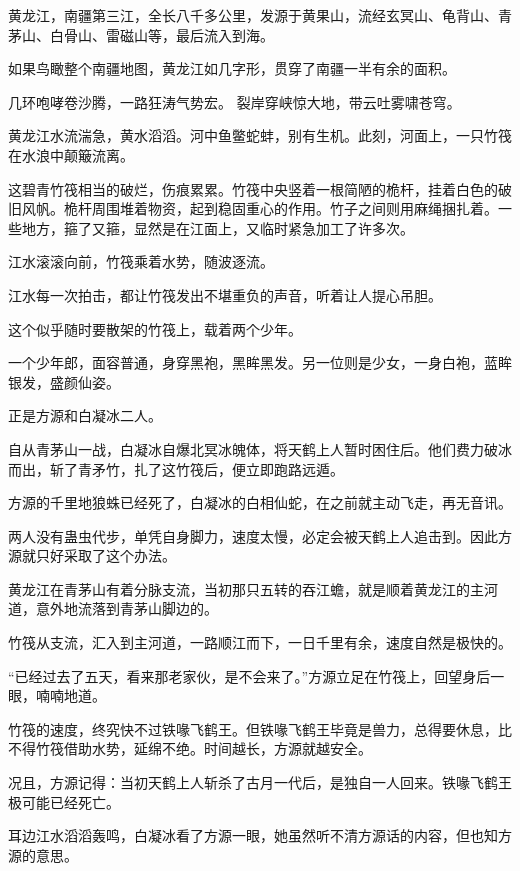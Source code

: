 
\begin{this_body}



黄龙江，南疆第三江，全长八千多公里，发源于黄果山，流经玄冥山、龟背山、青茅山、白骨山、雷磁山等，最后流入到海。

如果鸟瞰整个南疆地图，黄龙江如几字形，贯穿了南疆一半有余的面积。

几环咆哮卷沙腾，一路狂涛气势宏。 裂岸穿峡惊大地，带云吐雾啸苍穹。

黄龙江水流湍急，黄水滔滔。河中鱼鳖蛇蚌，别有生机。此刻，河面上，一只竹筏在水浪中颠簸流离。

这碧青竹筏相当的破烂，伤痕累累。竹筏中央竖着一根简陋的桅杆，挂着白色的破旧风帆。桅杆周围堆着物资，起到稳固重心的作用。竹子之间则用麻绳捆扎着。一些地方，箍了又箍，显然是在江面上，又临时紧急加工了许多次。

江水滚滚向前，竹筏乘着水势，随波逐流。

江水每一次拍击，都让竹筏发出不堪重负的声音，听着让人提心吊胆。

这个似乎随时要散架的竹筏上，载着两个少年。

一个少年郎，面容普通，身穿黑袍，黑眸黑发。另一位则是少女，一身白袍，蓝眸银发，盛颜仙姿。

正是方源和白凝冰二人。

自从青茅山一战，白凝冰自爆北冥冰魄体，将天鹤上人暂时困住后。他们费力破冰而出，斩了青矛竹，扎了这竹筏后，便立即跑路远遁。

方源的千里地狼蛛已经死了，白凝冰的白相仙蛇，在之前就主动飞走，再无音讯。

两人没有蛊虫代步，单凭自身脚力，速度太慢，必定会被天鹤上人追击到。因此方源就只好采取了这个办法。

黄龙江在青茅山有着分脉支流，当初那只五转的吞江蟾，就是顺着黄龙江的主河道，意外地流落到青茅山脚边的。

竹筏从支流，汇入到主河道，一路顺江而下，一日千里有余，速度自然是极快的。

“已经过去了五天，看来那老家伙，是不会来了。”方源立足在竹筏上，回望身后一眼，喃喃地道。

竹筏的速度，终究快不过铁喙飞鹤王。但铁喙飞鹤王毕竟是兽力，总得要休息，比不得竹筏借助水势，延绵不绝。时间越长，方源就越安全。

况且，方源记得：当初天鹤上人斩杀了古月一代后，是独自一人回来。铁喙飞鹤王极可能已经死亡。

耳边江水滔滔轰鸣，白凝冰看了方源一眼，她虽然听不清方源话的内容，但也知方源的意思。


\end{this_body}
